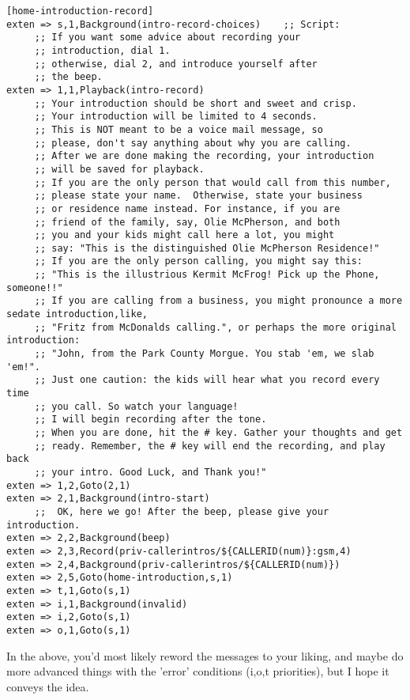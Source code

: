 \begin{astlisting}
\begin{verbatim}
[home-introduction-record]
exten => s,1,Background(intro-record-choices)    ;; Script:
     ;; If you want some advice about recording your
     ;; introduction, dial 1.
     ;; otherwise, dial 2, and introduce yourself after
     ;; the beep.
exten => 1,1,Playback(intro-record)
     ;; Your introduction should be short and sweet and crisp.
     ;; Your introduction will be limited to 4 seconds.
     ;; This is NOT meant to be a voice mail message, so
     ;; please, don't say anything about why you are calling.
     ;; After we are done making the recording, your introduction
     ;; will be saved for playback.
     ;; If you are the only person that would call from this number,
     ;; please state your name.  Otherwise, state your business
     ;; or residence name instead. For instance, if you are
     ;; friend of the family, say, Olie McPherson, and both
     ;; you and your kids might call here a lot, you might
     ;; say: "This is the distinguished Olie McPherson Residence!"
     ;; If you are the only person calling, you might say this:
     ;; "This is the illustrious Kermit McFrog! Pick up the Phone, someone!!"
     ;; If you are calling from a business, you might pronounce a more sedate introduction,like,
     ;; "Fritz from McDonalds calling.", or perhaps the more original introduction:
     ;; "John, from the Park County Morgue. You stab 'em, we slab 'em!".
     ;; Just one caution: the kids will hear what you record every time
     ;; you call. So watch your language!
     ;; I will begin recording after the tone.
     ;; When you are done, hit the # key. Gather your thoughts and get
     ;; ready. Remember, the # key will end the recording, and play back
     ;; your intro. Good Luck, and Thank you!"
exten => 1,2,Goto(2,1)
exten => 2,1,Background(intro-start)
     ;;  OK, here we go! After the beep, please give your introduction.
exten => 2,2,Background(beep)
exten => 2,3,Record(priv-callerintros/${CALLERID(num)}:gsm,4)
exten => 2,4,Background(priv-callerintros/${CALLERID(num)})
exten => 2,5,Goto(home-introduction,s,1)
exten => t,1,Goto(s,1)
exten => i,1,Background(invalid)
exten => i,2,Goto(s,1)
exten => o,1,Goto(s,1)
\end{verbatim}
\end{astlisting}

In the above, you'd most likely reword the messages to your liking,
and maybe do more advanced things with the 'error' conditions (i,o,t priorities),
but I hope it conveys the idea.


